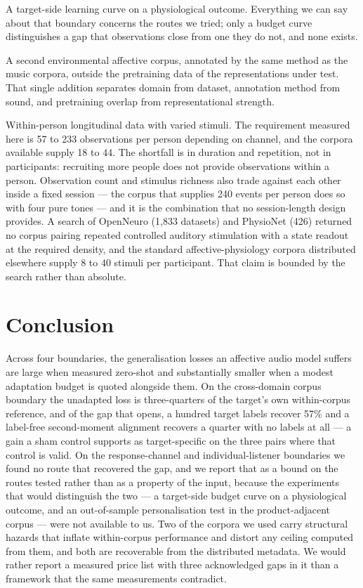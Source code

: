 A target-side learning curve on a physiological outcome. Everything we can say
about that boundary concerns the routes we tried; only a budget curve
distinguishes a gap that observations close from one they do not, and none
exists.

A second environmental affective corpus, annotated by the same method as the
music corpora, outside the pretraining data of the representations under test.
That single addition separates domain from dataset, annotation method from
sound, and pretraining overlap from representational strength.

Within-person longitudinal data with varied stimuli. The requirement measured
here is 57 to 233 observations per person depending on channel, and the corpora
available supply 18 to 44. The shortfall is in duration and repetition, not in
participants: recruiting more people does not provide observations within a
person. Observation count and stimulus richness also trade against each other
inside a fixed session --- the corpus that supplies 240 events per person does
so with four pure tones --- and it is the combination that no session-length
design provides. A search of OpenNeuro (1{,}833 datasets) and PhysioNet (426)
returned no corpus pairing repeated controlled auditory stimulation with a
state readout at the required density, and the standard affective-physiology
corpora distributed elsewhere supply 8 to 40 stimuli per participant. That
claim is bounded by the search rather than absolute.

\section{Conclusion}

Across four boundaries, the generalisation losses an affective audio model
suffers are large when measured zero-shot and substantially smaller when a
modest adaptation budget is quoted alongside them. On the cross-domain corpus
boundary the unadapted loss is three-quarters of the target's own within-corpus
reference, and of the gap that opens, a hundred target labels recover 57\% and
a label-free second-moment alignment recovers a quarter with no labels at all
--- a gain a sham control supports as target-specific on the three pairs where
that control is valid. On the response-channel and
individual-listener boundaries we found no route that recovered the gap, and
we report that as a bound on the routes tested rather than as a property of
the input, because the experiments that would distinguish the two --- a
target-side budget curve on a physiological outcome, and an out-of-sample
personalisation test in the product-adjacent corpus --- were not available to
us. Two of the corpora we used carry structural hazards that inflate
within-corpus performance and distort any ceiling computed from them, and both
are recoverable from the distributed metadata. We would rather report a
measured price list with three acknowledged gaps in it than a framework that
the same measurements contradict.

